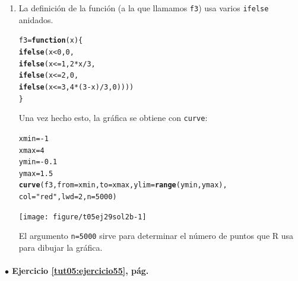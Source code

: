 \documentclass[10pt,a4paper]{article}\usepackage[]{graphicx}\usepackage[]{color}
\makeatletter
\newcommand{\hlnum}[1]{\textcolor[rgb]{0.686,0.059,0.569}{#1}}%
\newcommand{\hlstr}[1]{\textcolor[rgb]{0.192,0.494,0.8}{#1}}%
\newcommand{\hlopt}[1]{\textcolor[rgb]{0,0,0}{#1}}%
\newcommand{\hlstd}[1]{\textcolor[rgb]{0.345,0.345,0.345}{#1}}%
\newcommand{\hlkwa}[1]{\textcolor[rgb]{0.161,0.373,0.58}{\textbf{#1}}}%
\newcommand{\hlkwb}[1]{\textcolor[rgb]{0.69,0.353,0.396}{#1}}%
\newcommand{\hlkwc}[1]{\textcolor[rgb]{0.333,0.667,0.333}{#1}}%
\newcommand{\hlkwd}[1]{\textcolor[rgb]{0.737,0.353,0.396}{\textbf{#1}}}%
\newenvironment{kframe}{%
 \def\at@end@of@kframe{}%
 \ifinner\ifhmode%
  \def\at@end@of@kframe{\end{minipage}}%
  \begin{minipage}{\columnwidth}%
 \fi\fi%
 \def\FrameCommand##1{\hskip\@totalleftmargin \hskip-\fboxsep
 \colorbox{shadecolor}{##1}\hskip-\fboxsep
     \hskip-\linewidth \hskip-\@totalleftmargin \hskip\columnwidth}%
 \MakeFramed {\advance\hsize-\width
   \@totalleftmargin\z@ \linewidth\hsize
   \@setminipage}}%
 {\par\unskip\endMakeFramed%
 \at@end@of@kframe}
\newenvironment{knitrout}{}{} %
\makeatother
\begin{document}
\begin{enumerate}
\begin{knitrout}
\end{knitrout}
  \item La definición de la función (a la que llamamos {\tt f3}) usa varios {\tt ifelse} anidados.
\begin{knitrout}
\color{fgcolor}\begin{kframe}
\begin{alltt}
\hlstd{f3} \hlkwb{=} \hlkwa{function}\hlstd{(}\hlkwc{x}\hlstd{)\{}
    \hlkwd{ifelse}\hlstd{(x}\hlopt{<}\hlnum{0}\hlstd{,} \hlnum{0}\hlstd{,}
           \hlkwd{ifelse}\hlstd{(x}\hlopt{<=}\hlnum{1}\hlstd{,} \hlnum{2} \hlopt{*} \hlstd{x}\hlopt{/}\hlnum{3}\hlstd{,}
                  \hlkwd{ifelse}\hlstd{(x}\hlopt{<=}\hlnum{2}\hlstd{,} \hlnum{0}\hlstd{,}
                         \hlkwd{ifelse}\hlstd{(x}\hlopt{<=}\hlnum{3}\hlstd{,} \hlnum{4}\hlopt{*}\hlstd{(}\hlnum{3}\hlopt{-}\hlstd{x)}\hlopt{/}\hlnum{3}\hlstd{,} \hlnum{0}\hlstd{))))}
\hlstd{\}}
\end{alltt}
\end{kframe}
\end{knitrout}
        Una vez hecho esto, la gráfica se obtiene con {\tt curve}:
\begin{knitrout}
\color{fgcolor}\begin{kframe}
\begin{alltt}
\hlstd{xmin} \hlkwb{=} \hlopt{-}\hlnum{1}
\hlstd{xmax} \hlkwb{=} \hlnum{4}
\hlstd{ymin} \hlkwb{=} \hlopt{-}\hlnum{0.1}
\hlstd{ymax} \hlkwb{=} \hlnum{1.5}
\hlkwd{curve}\hlstd{(f3,} \hlkwc{from} \hlstd{= xmin,}\hlkwc{to} \hlstd{= xmax,} \hlkwc{ylim}\hlstd{=}\hlkwd{range}\hlstd{(ymin, ymax),}
      \hlkwc{col}\hlstd{=}\hlstr{"red"}\hlstd{,} \hlkwc{lwd}\hlstd{=}\hlnum{2}\hlstd{,} \hlkwc{n} \hlstd{=} \hlnum{5000}\hlstd{)}
\end{alltt}
\end{kframe}
\texttt{[image: figure/t05ej29sol2b-1]} 

\end{knitrout}
        El argumento {\tt n=5000} sirve para determinar el número de puntos que R usa para dibujar la gráfica.


\end{enumerate}

\paragraph{\bf $\bullet$ Ejercicio \ref{tut05:ejercicio55}, pág. \pageref{tut05:ejercicio55}}
\label{tut05:ejercicio55:sol}\quad\\
\end{document}
